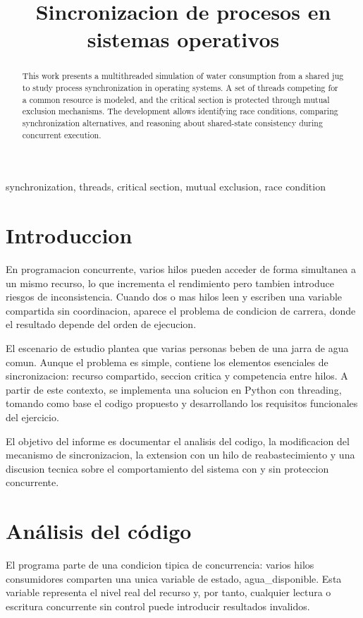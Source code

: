 ﻿\documentclass[conference]{IEEEtran}
\begin{document}
\title{Sincronizacion de procesos en sistemas operativos}

\author{
}

\maketitle

\begin{abstract}
This work presents a multithreaded simulation of water consumption from a shared jug to study process synchronization in operating systems. A set of threads competing for a common resource is modeled, and the critical section is protected through mutual exclusion mechanisms. The development allows identifying race conditions, comparing synchronization alternatives, and reasoning about shared-state consistency during concurrent execution.
\end{abstract}

\begin{IEEEkeywords}
synchronization, threads, critical section, mutual exclusion, race condition
\end{IEEEkeywords}

\section{Introduccion}
En programacion concurrente, varios hilos pueden acceder de forma simultanea a un mismo recurso, lo que incrementa el rendimiento pero tambien introduce riesgos de inconsistencia. Cuando dos o mas hilos leen y escriben una variable compartida sin coordinacion, aparece el problema de condicion de carrera, donde el resultado depende del orden de ejecucion.

El escenario de estudio plantea que varias personas beben de una jarra de agua comun. Aunque el problema es simple, contiene los elementos esenciales de sincronizacion: recurso compartido, seccion critica y competencia entre hilos. A partir de este contexto, se implementa una solucion en Python con threading, tomando como base el codigo propuesto y desarrollando los requisitos funcionales del ejercicio.

El objetivo del informe es documentar el analisis del codigo, la modificacion del mecanismo de sincronizacion, la extension con un hilo de reabastecimiento y una discusion tecnica sobre el comportamiento del sistema con y sin proteccion concurrente.

\section{Análisis del código}
El programa parte de una condicion tipica de concurrencia: varios hilos consumidores comparten una unica variable de estado, agua\_disponible. Esta variable representa el nivel real del recurso y, por tanto, cualquier lectura o escritura concurrente sin control puede introducir resultados invalidos.
\end{document}
